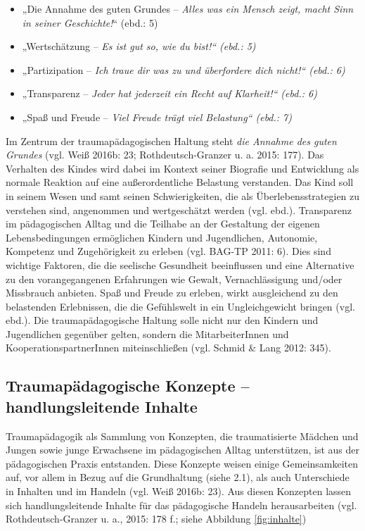 \begin{itemize}
\item „Die Annahme des guten Grundes – \textit{Alles was ein Mensch zeigt, macht Sinn in seiner Geschichte!}“ (ebd.: 5)
\item „Wertsch{\"a}tzung – \textit{Es ist gut so, wie du bist!“ (ebd.: 5)}
\item „Partizipation – \textit{Ich traue dir was zu und {\"u}berfordere dich nicht!“ (ebd.: 6)}
\item „Transparenz – \textit{Jeder hat jederzeit ein Recht auf Klarheit!“ (ebd.: 6)}
\item „Spaß und Freude – \textit{Viel Freude tr{\"a}gt viel Belastung“ (ebd.: 7)}
\end{itemize}

Im Zentrum der traumapädagogischen Haltung steht \textit{die Annahme des guten Grundes} (vgl. Weiß 2016b: 23; Rothdeutsch-Granzer u. a. 2015: 177). Das Verhalten des Kindes wird dabei im Kontext seiner Biografie und Entwicklung als normale Reaktion auf eine außerordentliche Belastung verstanden. Das Kind soll in seinem Wesen und samt seinen Schwierigkeiten, die als Überlebensstrategien zu verstehen sind, angenommen und wertgeschätzt werden (vgl. ebd.). Transparenz im pädagogischen Alltag und die Teilhabe an der Gestaltung der eigenen Lebensbedingungen ermöglichen Kindern und Jugendlichen, Autonomie, Kompetenz und Zugeh{\"o}rigkeit zu erleben (vgl. BAG-TP 2011: 6). Dies sind wichtige Faktoren, die die seelische Gesundheit beeinflussen und eine Alternative zu den vorangegangenen Erfahrungen wie Gewalt, Vernachl{\"a}ssigung und/oder Missbrauch anbieten. Spaß und Freude zu erleben, wirkt ausgleichend zu den belastenden Erlebnissen, die die Gefühlswelt in ein Ungleichgewicht bringen (vgl. ebd.). Die traumapädagogische Haltung solle nicht nur den Kindern und Jugendlichen gegenüber gelten, sondern die MitarbeiterInnen und KooperationspartnerInnen miteinschließen (vgl. Schmid \& Lang 2012: 345).

\subsection{Traumapädagogische Konzepte – handlungsleitende Inhalte}
Traumapädagogik als Sammlung von Konzepten, die traumatisierte Mädchen und Jungen sowie junge Erwachsene im pädagogischen Alltag unterstützen, ist aus der pädagogischen Praxis entstanden. Diese Konzepte weisen einige Gemeinsamkeiten auf, vor allem in Bezug auf die Grundhaltung (siehe 2.1), als auch Unterschiede in Inhalten und im Handeln (vgl. Weiß 2016b: 23). Aus diesen Konzepten lassen sich handlungsleitende Inhalte für das pädagogische Handeln herausarbeiten (vgl. Rothdeutsch-Granzer u. a., 2015: 178 f.; siehe Abbildung \ref{fig:inhalte})

